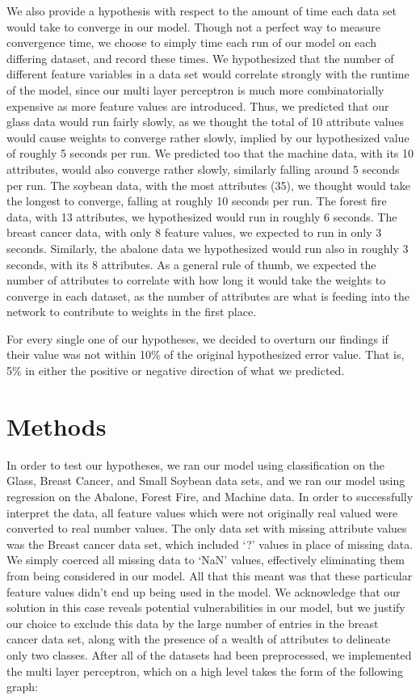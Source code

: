 \documentclass[twoside,11pt]{article}
\begin{document}
  We also provide a hypothesis with respect to the amount of time each data set would take to converge in our model. Though not a perfect way to measure
  convergence time, we choose to simply time each run of our model on each differing dataset, and record these times. We hypothesized that the number of
  different feature variables in a data set would correlate strongly with the runtime of the model, since our multi layer perceptron is much more 
  combinatorially expensive as more feature values are introduced. Thus, we predicted that our glass data would run fairly slowly, as we thought the total of
  10 attribute values would cause weights to converge rather slowly, implied by our hypothesized value of roughly 5 seconds per run.
  We predicted too that the machine data, with its 10 attributes, would also converge rather slowly, similarly falling around 5 seconds per run. The
  soybean data, with the most attributes (35), we thought would take the longest to converge, falling at roughly 10 seconds per run. The forest fire data,
  with 13 attributes, we hypothesized would run in roughly 6 seconds. The breast cancer data, with only 8 feature values, we expected to run in only 3 seconds.
  Similarly, the abalone data we hypothesized would run also in roughly 3 seconds, with its 8 attributes. As a general rule of thumb, we expected the number of
  attributes to correlate with how long it would take the weights to converge in each dataset, as the number of attributes are what is feeding into the network
  to contribute to weights in the first place.

  For every single one of our hypotheses, we decided to overturn our findings if their value was not within 10\% of the original hypothesized error value. 
  That is, 5\% in either the positive or negative direction of what we predicted.

\section{Methods}
In order to test our hypotheses, we ran our model using classification on the Glass, Breast Cancer, and Small Soybean data sets, and 
we ran our model using regression on the Abalone, Forest Fire, and Machine data. In order to successfully interpret the data, all feature values
which were not originally real valued were converted to real number values. The only data set with missing attribute values was the Breast cancer
data set, which included `?' values in place of missing data. We simply coerced all missing data to `NaN' values, effectively eliminating them from
being considered in our model. All that this meant was that these particular feature values didn't end up being used in the model. We acknowledge that our
solution in this case reveals potential vulnerabilities in our model, but we justify our choice to exclude this data by the large number of entries in the breast
cancer data set, along with the presence of a wealth of attributes to delineate only two classes. After all of the datasets had been preprocessed, we implemented the multi
layer perceptron, which on a high level takes the form of the following graph:
\end{document}
